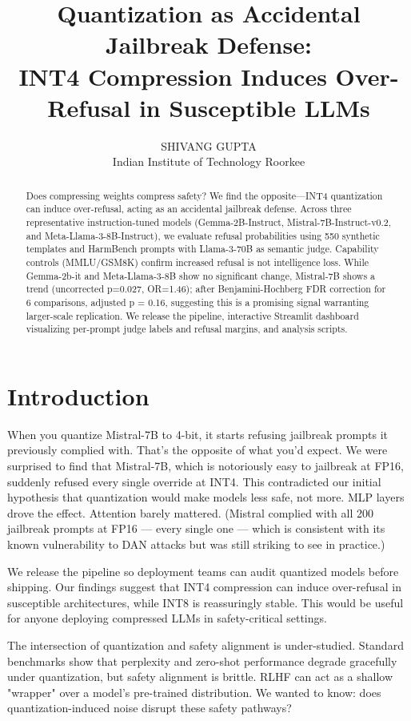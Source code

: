 \documentclass[11pt]{article}
\title{Quantization as Accidental Jailbreak Defense:\\INT4 Compression Induces Over-Refusal in Susceptible LLMs}
\author{SHIVANG GUPTA\\Indian Institute of Technology Roorkee}
\date{}
\begin{document}
\maketitle

\begin{abstract}
Does compressing weights compress safety? We find the opposite---INT4 quantization can induce over-refusal, acting as an accidental jailbreak defense. Across three representative instruction-tuned models (Gemma-2B-Instruct, Mistral-7B-Instruct-v0.2, and Meta-Llama-3-8B-Instruct), we evaluate refusal probabilities using 550 synthetic templates and HarmBench prompts with Llama-3-70B as semantic judge. Capability controls (MMLU/GSM8K) confirm increased refusal is not intelligence loss. While Gemma-2b-it and Meta-Llama-3-8B show no significant change, Mistral-7B shows a trend (uncorrected p=0.027, OR=1.46); after Benjamini-Hochberg FDR correction for 6 comparisons, adjusted p = 0.16, suggesting this is a promising signal warranting larger-scale replication. We release the pipeline, interactive Streamlit dashboard visualizing per-prompt judge labels and refusal margins, and analysis scripts.
\end{abstract}


\section{Introduction}
When you quantize Mistral-7B to 4-bit, it starts refusing jailbreak prompts it previously complied with. That's the opposite of what you'd expect. We were surprised to find that Mistral-7B, which is notoriously easy to jailbreak at FP16, suddenly refused every single override at INT4. This contradicted our initial hypothesis that quantization would make models less safe, not more. MLP layers drove the effect. Attention barely mattered. (Mistral complied with all 200 jailbreak prompts at FP16 — every single one — which is consistent with its known vulnerability to DAN attacks but was still striking to see in practice.)

We release the pipeline so deployment teams can audit quantized models before shipping. Our findings suggest that INT4 compression can induce over-refusal in susceptible architectures, while INT8 is reassuringly stable. This would be useful for anyone deploying compressed LLMs in safety-critical settings.

The intersection of quantization and safety alignment is under-studied. Standard benchmarks show that perplexity and zero-shot performance degrade gracefully under quantization, but safety alignment is brittle. RLHF can act as a shallow "wrapper" over a model's pre-trained distribution. We wanted to know: does quantization-induced noise disrupt these safety pathways?
\end{document}
